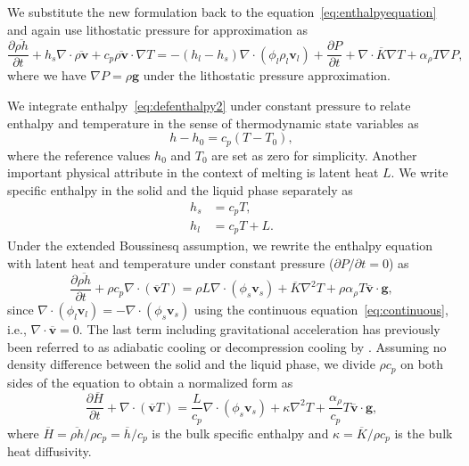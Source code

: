 We substitute the new formulation back to the equation~\eqref{eq:enthalpyequation} and again use lithostatic pressure for 
approximation as
\begin{equation}\label{eq:newenthalpyformulation}
\frac{\partial \overline{\rho h}}{\partial t} + h_s \nabla \cdot\overline{\rho \mathbf{v}} + c_p \overline{\rho \mathbf{v}} \cdot 
\nabla T = -(h_l - h_s) \nabla \cdot (\phi_l \rho_l \mathbf{v}_l) +\frac{\partial P}{\partial t} + \nabla \cdot \overline{K}\nabla T
+ \alpha_{\rho} T \nabla P,
\end{equation}
where we have $\nabla P = \rho \mathbf{g}$ under the lithostatic pressure approximation.

We integrate enthalpy~\eqref{eq:defenthalpy2} under constant pressure to relate enthalpy and temperature
in the sense of thermodynamic state variables as
\begin{equation}\label{eq:enthalpystate}
h-h_0 = c_p(T-T_0),
\end{equation}
where the reference values $h_0$ and $T_0$ are set as zero for simplicity.
Another important physical attribute in the context of melting is latent
heat $L$. We write specific enthalpy in the solid and the liquid phase
separately as
\begin{equation}\label{eq:specificenthalpylatentheat}
\begin{aligned}
h_s &= c_p T, \\
h_l &= c_p T + L.
\end{aligned}
\end{equation}
Under the extended Boussinesq assumption,
we rewrite the enthalpy equation with latent heat and temperature under constant pressure ($\partial P /\partial t = 0$) as
\begin{equation}\label{eq:energyconservationenthalpy}
\frac{\partial \overline{\rho h}}{\partial t} + \rho c_p \nabla \cdot (\overline{\mathbf{v}} T) = 
\rho L \nabla \cdot (\phi_s \mathbf{v}_s) + \overline{K} \nabla^2 T + \rho \alpha_\rho T \overline{\mathbf{v}} \cdot \mathbf{g},
\end{equation}
since $\nabla\cdot(\phi_l \mathbf{v}_l) = -\nabla \cdot (\phi_s \mathbf{v}_s)$ 
using the continuous equation~\eqref{eq:continuous}, i.e., $\nabla \cdot \overline{\mathbf{v}} = 0$.
The last term including gravitational acceleration has previously been referred 
to as adiabatic cooling or decompression cooling by 
\citet{ExtensionofLithosphere}.
Assuming no density difference between the solid and the liquid phase,
we divide $\rho c_p$ on both sides of the equation to obtain a normalized form as
\begin{equation}\label{eq:normalizedenthalpy}
		  \frac{\partial \overline{H}}{\partial t} + \nabla \cdot (\overline{\mathbf{v}} T) = 
		  \frac{L}{c_p} \nabla \cdot (\phi_s \mathbf{v}_s) + \kappa \nabla^2 T + 
		  \frac{\alpha_\rho}{c_p} T \overline{\mathbf{v}} \cdot \mathbf{g},
\end{equation}
where $\overline{H} = \overline{\rho h}/\rho c_p = \overline{h}/c_p$ is the bulk specific enthalpy and $\kappa = 
\overline{K}/\rho c_p$ is the bulk heat diffusivity.

